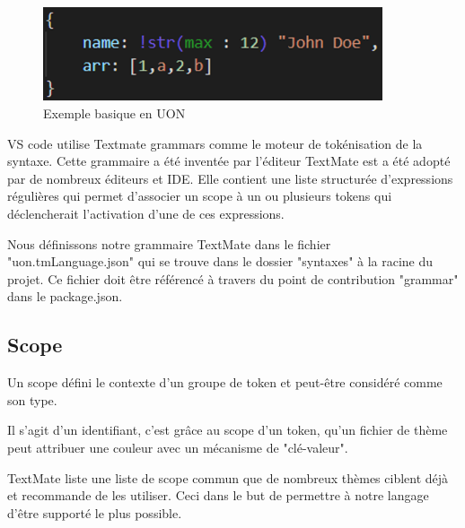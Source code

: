 \documentclass[
    iict, %
    il, %
]{heig-tb}
\begin{document}
\begin{figure}[!h]
    \begin{center}
        \includegraphics[width=10cm]{assets/figures/basic-uon.png}
    \end{center}
    \caption[code UON]{\label{basic-uon} Exemple basique en UON}
\end{figure}


VS code utilise Textmate grammars \cite{textmate-grammars} comme le moteur de tokénisation de la syntaxe.
Cette grammaire a été inventée par l'éditeur TextMate est a été adopté par de nombreux éditeurs et IDE.
Elle contient une liste structurée d'expressions régulières qui permet d'associer un scope
à un ou plusieurs tokens qui déclencherait l'activation d'une de ces expressions.

Nous définissons notre grammaire TextMate dans le fichier "uon.tmLanguage.json" qui se trouve dans le dossier "syntaxes" à la racine du projet.
Ce fichier doit être référencé à travers du point de contribution "grammar" dans le package.json.



\subsection{Scope}
Un scope défini le contexte d'un groupe de token et peut-être considéré comme son type.

Il s'agit d'un identifiant, c'est grâce au scope d'un token, qu'un fichier de thème peut attribuer une couleur avec un mécanisme de "clé-valeur".

TextMate liste une liste de scope commun que de nombreux thèmes ciblent déjà et recommande de les utiliser.
Ceci dans le but de permettre à notre langage d'être supporté le plus possible.
\end{document}
